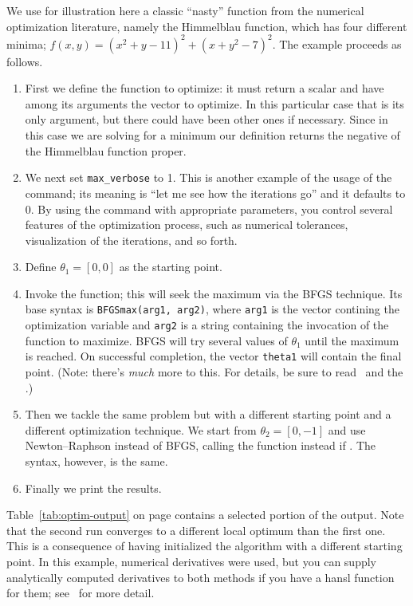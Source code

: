 We use for illustration here a classic ``nasty'' function from the
numerical optimization literature, namely the Himmelblau function,
which has four different minima; $f(x, y) = (x^2+y-11)^2 +
(x+y^2-7)^2$. The example proceeds as follows.
\begin{enumerate}
\item First we define the function to optimize: it must return a
  scalar and have among its arguments the vector to optimize. In this
  particular case that is its only argument, but there could have been
  other ones if necessary.  Since in this case we are solving for a
  minimum our definition returns the negative of the Himmelblau
  function proper.
\item We next set \verb|max_verbose| to 1. This is another example of
  the usage of the  command; its meaning is ``let me see how
  the iterations go'' and it defaults to 0. By using the 
  command with appropriate parameters, you control several features of
  the optimization process, such as numerical tolerances,
  visualization of the iterations, and so forth.
\item Define $\theta_1 = [0, 0]$ as the starting point.
\item Invoke the  function; this will seek the maximum
  via the BFGS technique. Its base syntax is \texttt{BFGSmax(arg1,
    arg2)}, where \texttt{arg1} is the vector contining the
  optimization variable and \texttt{arg2} is a string containing the
  invocation of the function to maximize. BFGS will try several values
  of $\theta_1$ until the maximum is reached. On successful
  completion, the vector \texttt{theta1} will contain the final
  point. (Note: there's \emph{much} more to this. For details, be sure
  to read \GUG\ and the \GCR.)
\item Then we tackle the same problem but with a different starting
  point and a different optimization technique. We start from
  $\theta_2 = [0, -1]$ and use Newton--Raphson instead of BFGS,
  calling the  function instead if . The
  syntax, however, is the same.
\item Finally we print the results.
\end{enumerate}

Table~\ref{tab:optim-output} on page \pageref{tab:optim-output}
contains a selected portion of the output. Note that the second run
converges to a different local optimum than the first one. This is a
consequence of having initialized the algorithm with a different
starting point. In this example, numerical derivatives were used, but
you can supply analytically computed derivatives to both methods if
you have a hansl function for them; see \GUG\ for more detail.

